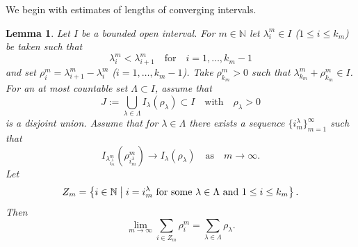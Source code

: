\documentclass[12pt, reqno]{amsart}
\numberwithin{equation}{section}
\newtheorem{lemma}[thm]{Lemma}
\begin{document}
We begin with estimates of lengths of converging intervals.
\begin{lemma} \label{LCIn}
Let $I$ be a bounded open interval.
 For $m\in\mathbb{N}$ let $\lambda_i^m\in I$ ($1\le i\le k_m$) be taken such that
\[
    \lambda_i^m < \lambda_{i+1}^m
    \quad\text{for}\quad
    i=1, \ldots, k_m - 1
\]
and set $\rho_i^m=\lambda_{i+1}^m-\lambda_i^m$ ($i=1,\ldots,k_m-1$).
 Take $\rho_{k_m}^m>0$ such that $\lambda_{k_m}^m+\rho_{k_m}^m\in I$.
 For an at most countable set $\Lambda\subset I$, assume that
\[
    J := \bigcup_{\lambda\in\Lambda}I_\lambda (\rho_\lambda) \subset I
    \quad\text{with}\quad \rho_\lambda > 0
\]
is a disjoint union.
 Assume that for $\lambda\in\Lambda$ there exists a sequence $\{i_m^\lambda\}_{m=1}^\infty$ such that
\[
    I_{\lambda_{i_m^\lambda}^m} (\rho_{i_m^\lambda}^m )
    \to I_\lambda(\rho_\lambda)
    \quad\text{as}\quad m\to\infty.
\]
Let
\[
    Z_m = \left\{ i \in \mathbb{N} \bigm|
    i=i_m^\lambda\ \text{for some}\ \lambda\in\Lambda\ \text{and}\ 1\le i\le k_m \right\}.
\]
Then
\[
    \lim_{m\to\infty} \sum_{i\in Z_m} \rho_i^m = \sum_{\lambda\in\Lambda} \rho_\lambda.
\]
\end{lemma}
%
\end{document}
